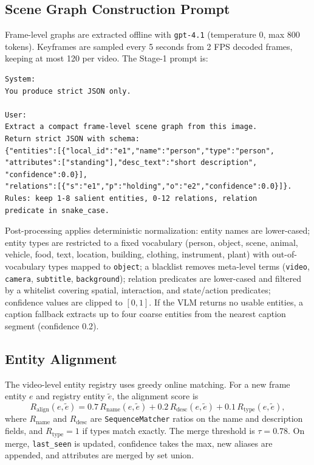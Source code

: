 \documentclass[sigconf, screen, review, anonymous]{acmart}
\newcommand{\code}[1]{\texttt{\nolinkurl{#1}}}
\begin{document}
\subsection{Scene Graph Construction Prompt}
\label{sec:prompts-sg}

Frame-level graphs are extracted offline with \code{gpt-4.1} (temperature 0, max 800 tokens). Keyframes are sampled every 5 seconds from 2 FPS decoded frames, keeping at most 120 per video. The Stage-1 prompt is:

\begin{lstlisting}
System:
You produce strict JSON only.

User:
Extract a compact frame-level scene graph from this image.
Return strict JSON with schema:
{"entities":[{"local_id":"e1","name":"person","type":"person",
"attributes":["standing"],"desc_text":"short description",
"confidence":0.0}],
"relations":[{"s":"e1","p":"holding","o":"e2","confidence":0.0}]}.
Rules: keep 1-8 salient entities, 0-12 relations, relation
predicate in snake_case.
\end{lstlisting}

Post-processing applies deterministic normalization: entity names are lower-cased; entity types are restricted to a fixed vocabulary (person, object, scene, animal, vehicle, food, text, location, building, clothing, instrument, plant) with out-of-vocabulary types mapped to \code{object}; a blacklist removes meta-level terms (\code{video}, \code{camera}, \code{subtitle}, \code{background}); relation predicates are lower-cased and filtered by a whitelist covering spatial, interaction, and state/action predicates; confidence values are clipped to $[0,1]$. If the VLM returns no usable entities, a caption fallback extracts up to four coarse entities from the nearest caption segment (confidence 0.2).

\subsection{Entity Alignment}
\label{sec:prompts-align}

The video-level entity registry uses greedy online matching. For a new frame entity $e$ and registry entity $\tilde e$, the alignment score is
\begin{equation}
R_{\text{align}}(e,\tilde e) = 0.7\, R_{\text{name}}(e,\tilde e) + 0.2\, R_{\text{desc}}(e,\tilde e) + 0.1\, R_{\text{type}}(e,\tilde e),
\end{equation}
where $R_{\text{name}}$ and $R_{\text{desc}}$ are \code{SequenceMatcher} ratios on the name and description fields, and $R_{\text{type}}=1$ if types match exactly. The merge threshold is $\tau=0.78$. On merge, \code{last_seen} is updated, confidence takes the max, new aliases are appended, and attributes are merged by set union.
\end{document}
